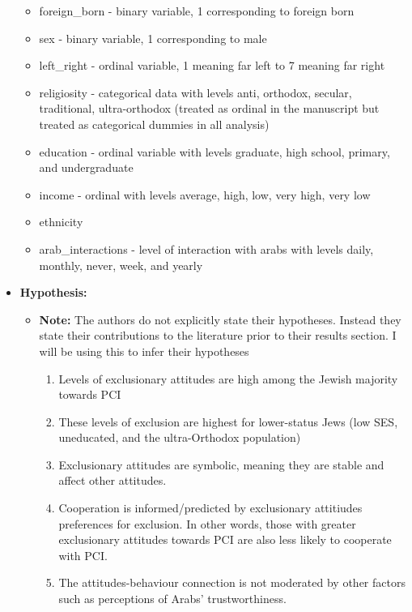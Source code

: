 \documentclass[12pt,letterpaper]{article}
\begin{document}
\begin{itemize}
\begin{itemize}
				\item foreign\_born - binary variable, 1 corresponding to foreign born 
				\item sex - binary variable, 1 corresponding to male
				\item left\_right - ordinal variable, 1 meaning far left to 7 meaning far right             
				\item religiosity - categorical data with levels anti, orthodox, secular, traditional, ultra-orthodox (treated as ordinal in the manuscript but treated as categorical dummies in all analysis)
				\item education - ordinal variable with levels graduate, high school, primary, and undergraduate
				\item income - ordinal with levels average, high, low, very high, very low 
				\item ethnicity 
				\item arab\_interactions - level of interaction with arabs with levels daily, monthly, never, week, and yearly
			\end{itemize}
		\item \textbf{Hypothesis:}
			\begin{itemize}
				\item \textbf{Note:} The authors do not explicitly state their hypotheses. Instead they state their contributions to the literature prior to their results section. I will be using this to infer their hypotheses
					\begin{enumerate}
						\item Levels of exclusionary attitudes are high among the Jewish majority towards PCI
						\item These levels of exclusion are highest for lower-status Jews (low SES, uneducated, and the ultra-Orthodox population)
						\item Exclusionary attitudes are symbolic, meaning they are stable and affect other attitudes.
						\item Cooperation is informed/predicted by exclusionary attitiudes preferences for exclusion. In other words, those with greater exclusionary attitudes towards PCI are also less likely to cooperate with PCI.
						\item The attitudes-behaviour connection is not moderated by other factors such as perceptions of Arabs’ trustworthiness.
					\end{enumerate}
			\end{itemize}
		
	\end{itemize}
\end{document}
